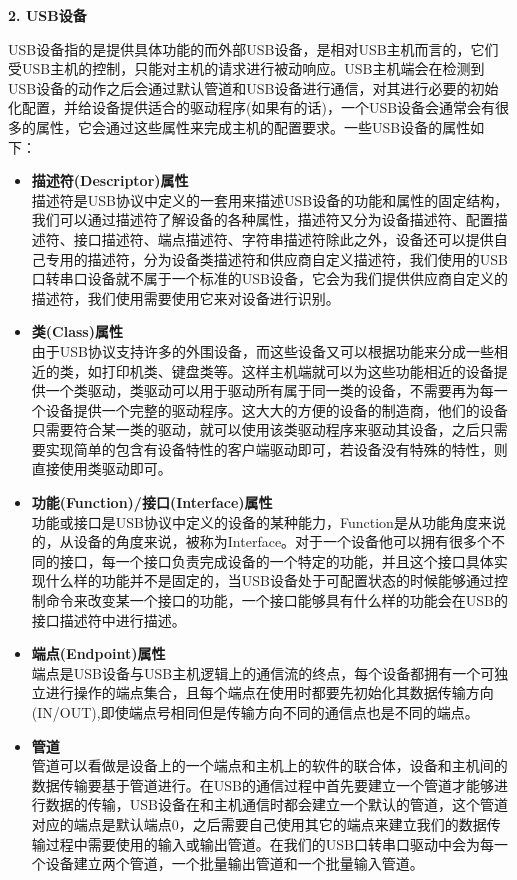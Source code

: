 \noindent \textbf{2. USB设备}

	USB设备指的是提供具体功能的而外部USB设备，是相对USB主机而言的，它们受USB主机的控制，只能对主机的请求进行被动响应。USB主机端会在检测到USB设备的动作之后会通过默认管道和USB设备进行通信，对其进行必要的初始化配置，并给设备提供适合的驱动程序(如果有的话)，一个USB设备会通常会有很多的属性，它会通过这些属性来完成主机的配置要求。一些USB设备的属性如下：
	\begin{itemize}
	\item \textbf{描述符(Descriptor)属性}\\
	描述符是USB协议中定义的一套用来描述USB设备的功能和属性的固定结构，我们可以通过描述符了解设备的各种属性，描述符又分为设备描述符、配置描述符、接口描述符、端点描述符、字符串描述符\cite{张杰2008基于}\cite{边海龙2004USB}除此之外，设备还可以提供自己专用的描述符，分为设备类描述符和供应商自定义描述符，我们使用的USB口转串口设备就不属于一个标准的USB设备，它会为我们提供供应商自定义的描述符，我们使用需要使用它来对设备进行识别。
	
	\item \textbf{类(Class)属性}\\
	由于USB协议支持许多的外围设备，而这些设备又可以根据功能来分成一些相近的类，如打印机类、键盘类等。这样主机端就可以为这些功能相近的设备提供一个类驱动，类驱动可以用于驱动所有属于同一类的设备，不需要再为每一个设备提供一个完整的驱动程序。这大大的方便的设备的制造商，他们的设备只需要符合某一类的驱动，就可以使用该类驱动程序来驱动其设备，之后只需要实现简单的包含有设备特性的客户端驱动即可，若设备没有特殊的特性，则直接使用类驱动即可\cite{李雪红2004USB}。	
	
	\item \textbf{功能(Function)/接口(Interface)属性}\\
	功能或接口是USB协议中定义的设备的某种能力，Function是从功能角度来说的，从设备的角度来说，被称为Interface。对于一个设备他可以拥有很多个不同的接口，每一个接口负责完成设备的一个特定的功能，并且这个接口具体实现什么样的功能并不是固定的，当USB设备处于可配置状态的时候能够通过控制命令来改变某一个接口的功能，一个接口能够具有什么样的功能会在USB的接口描述符中进行描述。
	
	\item \textbf{端点(Endpoint)属性}\\
	端点是USB设备与USB主机逻辑上的通信流的终点，每个设备都拥有一个可独立进行操作的端点集合，且每个端点在使用时都要先初始化其数据传输方向(IN/OUT),即使端点号相同但是传输方向不同的通信点也是不同的端点\cite{李雪红2004USB}。
	
	\item \textbf{管道}\\
	管道可以看做是设备上的一个端点和主机上的软件的联合体，设备和主机间的数据传输要基于管道进行。在USB的通信过程中首先要建立一个管道才能够进行数据的传输，USB设备在和主机通信时都会建立一个默认的管道，这个管道对应的端点是默认端点0，之后需要自己使用其它的端点来建立我们的数据传输过程中需要使用的输入或输出管道。在我们的USB口转串口驱动中会为每一个设备建立两个管道，一个批量输出管道和一个批量输入管道。
	

\end{itemize}
